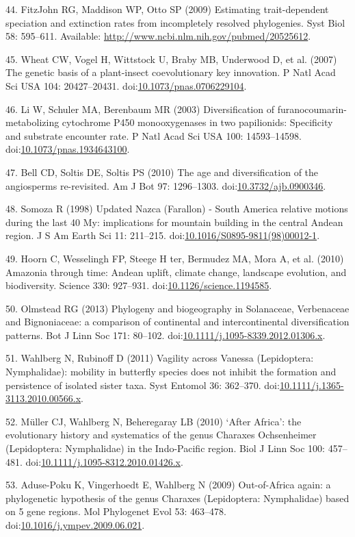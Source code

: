 \documentclass[10pt]{article}
\begin{document}
44. FitzJohn RG, Maddison WP, Otto SP (2009) Estimating trait-dependent
speciation and extinction rates from incompletely resolved phylogenies.
Syst Biol 58: 595--611. Available:
\url{http://www.ncbi.nlm.nih.gov/pubmed/20525612}.

45. Wheat CW, Vogel H, Wittstock U, Braby MB, Underwood D, et al. (2007)
The genetic basis of a plant-insect coevolutionary key innovation. P
Natl Acad Sci USA 104: 20427--20431.
doi:\href{http://dx.doi.org/10.1073/pnas.0706229104}{10.1073/pnas.0706229104}.

46. Li W, Schuler MA, Berenbaum MR (2003) Diversification of
furanocoumarin-metabolizing cytochrome P450 monooxygenases in two
papilionids: Specificity and substrate encounter rate. P Natl Acad Sci
USA 100: 14593--14598.
doi:\href{http://dx.doi.org/10.1073/pnas.1934643100}{10.1073/pnas.1934643100}.

47. Bell CD, Soltis DE, Soltis PS (2010) The age and diversification of
the angiosperms re-revisited. Am J Bot 97: 1296--1303.
doi:\href{http://dx.doi.org/10.3732/ajb.0900346}{10.3732/ajb.0900346}.

48. Somoza R (1998) Updated Nazca (Farallon) - South America relative
motions during the last 40 My: implications for mountain building in the
central Andean region. J S Am Earth Sci 11: 211--215.
doi:\href{http://dx.doi.org/10.1016/S0895-9811(98)00012-1}{10.1016/S0895-9811(98)00012-1}.

49. Hoorn C, Wesselingh FP, Steege H ter, Bermudez MA, Mora A, et al.
(2010) Amazonia through time: Andean uplift, climate change, landscape
evolution, and biodiversity. Science 330: 927--931.
doi:\href{http://dx.doi.org/10.1126/science.1194585}{10.1126/science.1194585}.

50. Olmstead RG (2013) Phylogeny and biogeography in Solanaceae,
Verbenaceae and Bignoniaceae: a comparison of continental and
intercontinental diversification patterns. Bot J Linn Soc 171: 80--102.
doi:\href{http://dx.doi.org/10.1111/j.1095-8339.2012.01306.x}{10.1111/j.1095-8339.2012.01306.x}.

51. Wahlberg N, Rubinoff D (2011) Vagility across Vanessa (Lepidoptera:
Nymphalidae): mobility in butterfly species does not inhibit the
formation and persistence of isolated sister taxa. Syst Entomol 36:
362--370.
doi:\href{http://dx.doi.org/10.1111/j.1365-3113.2010.00566.x}{10.1111/j.1365-3113.2010.00566.x}.

52. Müller CJ, Wahlberg N, Beheregaray LB (2010) `After Africa': the
evolutionary history and systematics of the genus Charaxes Ochsenheimer
(Lepidoptera: Nymphalidae) in the Indo-Pacific region. Biol J Linn Soc
100: 457--481.
doi:\href{http://dx.doi.org/10.1111/j.1095-8312.2010.01426.x}{10.1111/j.1095-8312.2010.01426.x}.

53. Aduse-Poku K, Vingerhoedt E, Wahlberg N (2009) Out-of-Africa again:
a phylogenetic hypothesis of the genus Charaxes (Lepidoptera:
Nymphalidae) based on 5 gene regions. Mol Phylogenet Evol 53: 463--478.
doi:\href{http://dx.doi.org/10.1016/j.ympev.2009.06.021}{10.1016/j.ympev.2009.06.021}.
\end{document}
